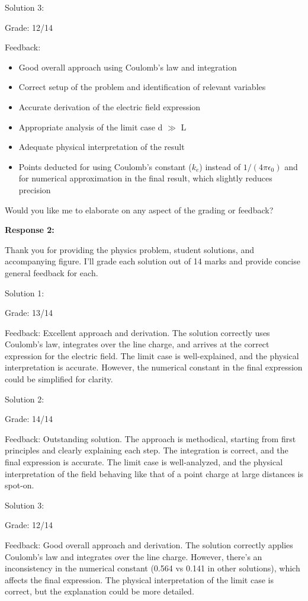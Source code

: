 \documentclass[a4paper,11pt]{article}
\begin{document}
Solution 3:

Grade: 12/14

Feedback:
\begin{itemize}
\item Good overall approach using Coulomb's law and integration
\item Correct setup of the problem and identification of relevant variables
\item Accurate derivation of the electric field expression
\item Appropriate analysis of the limit case d $\gg$ L
\item Adequate physical interpretation of the result
\item Points deducted for using Coulomb's constant ($k_e$) instead of $1/(4\pi\epsilon_0)$ and for numerical approximation in the final result, which slightly reduces precision
\end{itemize}

Would you like me to elaborate on any aspect of the grading or feedback?

\bigskip
\textbf{Response 2:}

Thank you for providing the physics problem, student solutions, and accompanying figure. I'll grade each solution out of 14 marks and provide concise general feedback for each.

Solution 1:

Grade: 13/14

Feedback: Excellent approach and derivation. The solution correctly uses Coulomb's law, integrates over the line charge, and arrives at the correct expression for the electric field. The limit case is well-explained, and the physical interpretation is accurate. However, the numerical constant in the final expression could be simplified for clarity.

Solution 2:

Grade: 14/14

Feedback: Outstanding solution. The approach is methodical, starting from first principles and clearly explaining each step. The integration is correct, and the final expression is accurate. The limit case is well-analyzed, and the physical interpretation of the field behaving like that of a point charge at large distances is spot-on.

Solution 3:

Grade: 12/14

Feedback: Good overall approach and derivation. The solution correctly applies Coulomb's law and integrates over the line charge. However, there's an inconsistency in the numerical constant (0.564 vs 0.141 in other solutions), which affects the final expression. The physical interpretation of the limit case is correct, but the explanation could be more detailed.
\end{document}
